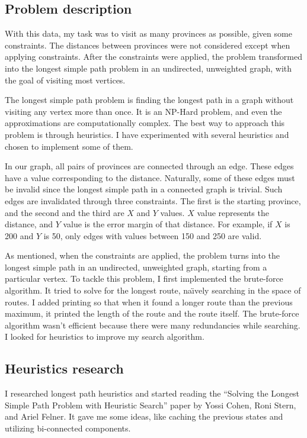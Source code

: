 \documentclass[12pt,a4paper]{article}
\begin{document}
\subsection{Problem description}

With this data, my task was to visit as many provinces as possible, given some
constraints. The distances between provinces were not considered except when
applying constraints. After the constraints were applied, the problem
transformed into the longest simple path problem in an undirected, unweighted
graph, with the goal of visiting most vertices.

The longest simple path problem is finding the longest path in a graph without
visiting any vertex more than once. It is an NP-Hard problem, and even the
approximations are computationally complex. The best way to approach this
problem is through heuristics. I have experimented with several heuristics and
chosen to implement some of them.

In our graph, all pairs of provinces are connected through an edge. These edges
have a value corresponding to the distance. Naturally, some of these edges must
be invalid since the longest simple path in a connected graph is trivial. Such
edges are invalidated through three constraints. The first is the starting
province, and the second and the third are \(X\) and \(Y\) values. \(X\) value
represents the distance, and \(Y\) value is the error margin of that distance.
For example, if \(X\) is 200 and \(Y\) is 50, only edges with values between 150
and 250 are valid.

As mentioned, when the constraints are applied, the problem turns into the
longest simple path in an undirected, unweighted graph, starting from a
particular vertex. To tackle this problem, I first implemented the brute-force
algorithm. It tried to solve for the longest route, na{\"\i}vely searching in
the space of routes. I added printing so that when it found a longer route than
the previous maximum, it printed the length of the route and the route itself.
The brute-force algorithm wasn't efficient because there were many redundancies
while searching. I looked for heuristics to improve my search algorithm.

\subsection{Heuristics research}

I researched longest path heuristics and started reading the ``Solving the
Longest Simple Path Problem with Heuristic Search'' paper by Yossi Cohen, Roni
Stern, and Ariel Felner. It gave me some ideas, like caching the previous states
and utilizing bi-connected components.
\end{document}
